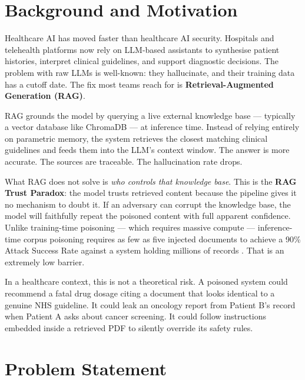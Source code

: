 
\section{Background and Motivation}

Healthcare AI has moved faster than healthcare AI security. Hospitals and telehealth platforms now rely on LLM-based assistants to synthesise patient histories, interpret clinical guidelines, and support diagnostic decisions. The problem with raw LLMs is well-known: they hallucinate, and their training data has a cutoff date. The fix most teams reach for is \textbf{Retrieval-Augmented Generation (RAG)}.

RAG grounds the model by querying a live external knowledge base --- typically a vector database like ChromaDB --- at inference time. Instead of relying entirely on parametric memory, the system retrieves the closest matching clinical guidelines and feeds them into the LLM's context window. The answer is more accurate. The sources are traceable. The hallucination rate drops.

What RAG does not solve is \textit{who controls that knowledge base}. This is the \textbf{RAG Trust Paradox}: the model trusts retrieved content because the pipeline gives it no mechanism to doubt it. If an adversary can corrupt the knowledge base, the model will faithfully repeat the poisoned content with full apparent confidence. Unlike training-time poisoning --- which requires massive compute --- inference-time corpus poisoning requires as few as five injected documents to achieve a 90\% Attack Success Rate against a system holding millions of records \cite{poisonedrag2025}. That is an extremely low barrier.

In a healthcare context, this is not a theoretical risk. A poisoned system could recommend a fatal drug dosage citing a document that looks identical to a genuine NHS guideline. It could leak an oncology report from Patient B's record when Patient A asks about cancer screening. It could follow instructions embedded inside a retrieved PDF to silently override its safety rules.

\section{Problem Statement}


